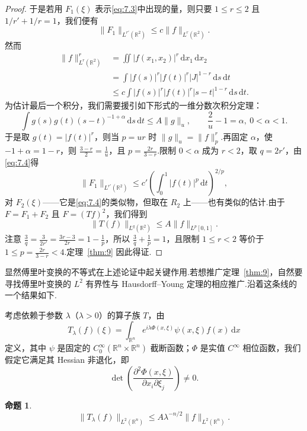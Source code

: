 \documentclass[
  BookTitleCN={傅里叶分析中的振动积分},
  BookTitleEN={Oscillatory Integrals in Fourier Analysis},
  OriginalAuthor={E.~M. Stein},
  OriginalEdition={Proc. Sympos. Pure Math. 35, Part~1},
  OriginalPublisher={American Mathematical Society},
  OriginalYear={1979},
  Translator={翻译及重排},
  ModelUsed={Codex CLI},
  Biblatex=false,
  TranslationDate={2026年8月27日}
]{mathtranslation}
\numberwithin{equation}{chapter}   %
\newtheorem*{proposition*}{命题}
\newcommand{\R}{\mathbb{R}}
\begin{document}
\begin{proof}
  于是若用 $F_{1}(\xi)$ 表示\eqref{eq:7.3}中出现的量，则只要 $1\leq r\leq2$ 且 $1/r'+1/r=1$，我们便有
  \begin{equation}
    \|F_{1}\|_{L^{r'}(\R^{2})}\leq c\|f\|_{L^{r}(\R^{2})} . \label{eq:7.4}
  \end{equation}
  然而
  \begin{align*}
    \|f\|_{L^{r}(\R^{2})}^{r} &= \iint|f(x_{1},x_{2})|^{r}\,\mathrm{d}x_{1}\,\mathrm{d}x_{2}\\
    &= \int|f(s)|^{r}|f(t)|^{r}|J|^{1-r}\,\mathrm{d}s\,\mathrm{d}t\\
    &\leq c\int|f(s)|^{r}|f(t)|^{r}|s-t|^{1-r}\,\mathrm{d}s\,\mathrm{d}t .
  \end{align*}
  为估计最后一个积分，我们需要援引如下形式的一维分数次积分定理：
  \[
    \int g(s)g(t)(s-t)^{-1+\alpha}\,\mathrm{d}s\,\mathrm{d}t\leq A\|g\|_{u},\qquad \frac{2}{u}-1=\alpha,\ 0<\alpha<1 .
  \]
  于是取 $g(t)=|f(t)|^{r}$，则当 $p=ur$ 时 $\|g\|_{u}=\|f\|_{p}^{r}$.再固定 $\alpha$，使 $-1+\alpha=1-r$，则 $\frac{3-r}{2}=\frac{1}{u}$，且 $p=\frac{2r}{3-r}$.限制 $0<\alpha$ 成为 $r<2$，取 $q=2r'$，由\eqref{eq:7.4}得
  \[
    \|F_{1}\|_{L^{r'}(\R^{2})}\leq c'\left(\int_{0}^{1}|f(t)|^{p}\,\mathrm{d}t\right)^{2/p},
  \]
  对 $F_{2}(\xi)$——它是\eqref{eq:7.4}的类似物，但取在 $R_{2}$ 上——也有类似的估计.由于 $F=F_{1}+F_{2}$ 且 $F=(Tf)^{2}$，我们得到
  \[
    \|T(f)\|_{L^{q}(\R^{2})}\leq A\|f\|_{L^{p}[0,1]} .
  \]
  注意 $\frac{3}{q}=\frac{3}{2r'}=\frac{3r-3}{2r}=1-\frac{1}{p}$，所以 $\frac{3}{q}+\frac{1}{p}=1$，且限制 $1\leq r<2$ 等价于 $1\leq p=\frac{2r}{3-r}<4$.定理~\ref{thm:9} 因此得证.
\end{proof}

\noindent 显然傅里叶变换的不等式在上述论证中起关键作用.若想推广定理~\ref{thm:9}，自然要寻找傅里叶变换的 $L^{2}$ 有界性与 Hausdorff--Young 定理的相应推广.沿着这条线的一个结果如下.

\noindent 考虑依赖于参数 $\lambda$（$\lambda>0$）的算子族 $T$，由
\[
  T_{\lambda}(f)(\xi)=\int_{\R^{n}}e^{i\lambda\Phi(x,\xi)}\psi(x,\xi)f(x)\,\mathrm{d}x
\]
定义，其中 $\psi$ 是固定的 $C_{0}^{\infty}(\R^{n}\times\R^{n})$ 截断函数；$\Phi$ 是实值 $C^{\infty}$ 相位函数，我们假定它满足其 Hessian 非退化，即
\setcounter{equation}{5}
\begin{equation}
  \det\left(\frac{\partial^{2}\Phi(x,\xi)}{\partial x_{i}\partial\xi_{j}}\right)\neq0 . \label{eq:7.6}
\end{equation}

\begin{proposition*}
  \begin{equation}
    \|T_{\lambda}(f)\|_{L^{2}(\R^{n})}\leq A\lambda^{-n/2}\|f\|_{L^{2}(\R^{n})} . \label{eq:7.7}
  \end{equation}
\end{proposition*}
\end{document}
